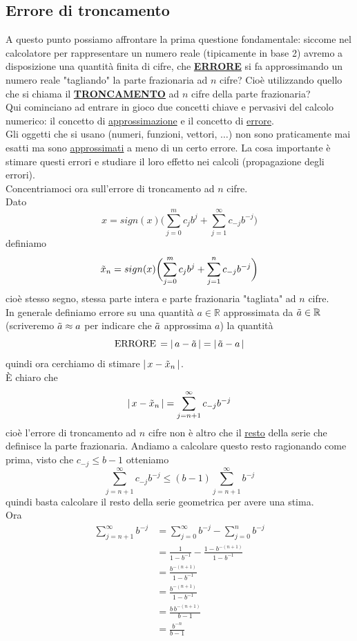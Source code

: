 \documentclass[12pt]{article}
\begin{document}
\subsection*{Errore di troncamento}
A questo punto possiamo affrontare la prima questione fondamentale: siccome nel calcolatore per rappresentare un numero reale (tipicamente in base 2) avremo a disposizione una quantità finita di cifre, che \underline{\textbf{ERRORE}} si fa approssimando un numero reale "tagliando" la parte frazionaria ad $n$ cifre? Cioè utilizzando quello che si chiama il \underline{\textbf{TRONCAMENTO}} ad $n$ cifre della parte frazionaria? \\
Qui cominciano ad entrare in gioco due concetti chiave e pervasivi del calcolo numerico: il concetto di \underline{approssimazione} e il concetto di \underline{errore}. \\
Gli oggetti che si usano (numeri, funzioni, vettori, $\dotsc$) non sono praticamente mai esatti ma sono \underline{approssimati} a meno di un certo errore. La cosa importante è stimare questi errori e studiare il loro effetto nei calcoli (propagazione degli errori). \\
Concentriamoci ora sull'errore di troncamento ad $n$ cifre.\\
Dato \[ x = sign(x) \biggl( \sum_{j=0}^m c_j b^j + \sum_{j=1}^\infty c_{-j} b^{-j} \biggr) \]
definiamo \[ \Tilde{x}_n = sign(x) \biggl( \sum_{j=0}^m c_j b^j + \sum_{j=1}^n c_{-j} b^{-j} \biggr) \]
cioè stesso segno, stessa parte intera e parte frazionaria "tagliata" ad $n$ cifre. \\
In generale definiamo errore su una quantità $a \in \mathbb{R}$ approssimata da $\Tilde{a} \in \mathbb{R}$ (scriveremo $\Tilde{a} \approx a$ per indicare che $\Tilde{a}$ approssima $a$) la quantità \[ \text{ERRORE}\,= \lvert \, a - \Tilde{a} \,\rvert = \lvert \, \Tilde{a} - a \,\rvert \]
quindi ora cerchiamo di stimare $\lvert \, x - \Tilde{x}_n \,\rvert$. \\
È chiaro che \[ \lvert \, x - \Tilde{x}_n \,\rvert = \sum_{j=n+1}^\infty c_{-j} b^{-j} \]
cioè l'errore di troncamento ad $n$ cifre non è altro che il \underline{resto} della serie che definisce la parte frazionaria. Andiamo a calcolare questo resto ragionando come prima, visto che $c_{-j} \le b - 1$ otteniamo
\[ \sum_{j=n+1}^{\infty} c_{-j}b^{-j} \le (b-1)\sum_{j=n+1}^{\infty} b^{-j} \]
quindi basta calcolare il resto della serie geometrica per avere una stima. \\
Ora
\[ \begin{split}
    \sum_{j=n+1}^{\infty} b^{-j} & = \sum_{j=0}^{\infty} b^{-j} - \sum_{j=0}^{n} b^{-j} \\
    & = \frac{1}{1 - b^{-1}} - \frac{1 - b^{-(n+1)}}{1 - b^{-1}} \\
    & = \frac{b^{-(n+1)}}{1 - b^{-1}} \\
    & = \frac{b^{-(n+1)}}{1 - b^{-1}} \\
    & = \frac{b\,b^{-(n+1)}}{b - 1} \\
    & = \frac{b^{-n}}{b - 1}
\end{split} \]
\end{document}
